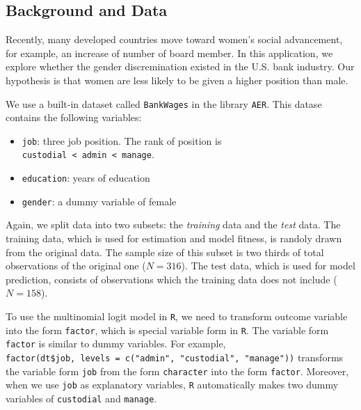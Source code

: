 \documentclass[
  12pt,
]{article}
\providecommand{\tightlist}{%
  \setlength{\itemsep}{0pt}\setlength{\parskip}{0pt}}
\begin{document}
\hypertarget{background-and-data-1}{%
\subsection{Background and Data}\label{background-and-data-1}}

Recently, many developed countries move toward women's social
advancement, for example, an increase of number of board member. In this
application, we explore whether the gender discremination existed in the
U.S. bank industry. Our hypothesis is that women are less likely to be
given a higher position than male.

We use a built-in dataset called \texttt{BankWages} in the library
\texttt{AER}. This datase contains the following variables:

\begin{itemize}
\tightlist
\item
  \texttt{job}: three job position. The rank of position is
  \texttt{custodial\ \textless{}\ admin\ \textless{}\ manage}.
\item
  \texttt{education}: years of education
\item
  \texttt{gender}: a dummy variable of female
\end{itemize}

Again, we split data into two subsets: the \emph{training} data and the
\emph{test} data. The training data, which is used for estimation and
model fitness, is randoly drawn from the original data. The sample size
of this subset is two thirds of total observations of the original one
(\(N = 316\)). The test data, which is used for model prediction,
consists of observations which the training data does not include
(\(N = 158\)).

To use the multinomial logit model in \texttt{R}, we need to transform
outcome variable into the form \texttt{factor}, which is special
variable form in \texttt{R}. The variable form \texttt{factor} is
similar to dummy variables. For example,
\texttt{factor(dt\$job,\ levels\ =\ c("admin",\ "custodial",\ "manage"))}
transforms the variable form \texttt{job} from the form
\texttt{character} into the form \texttt{factor}. Moreover, when we use
\texttt{job} as explanatory variables, \texttt{R} automatically makes
two dummy variables of \texttt{custodial} and \texttt{manage}.
\end{document}
